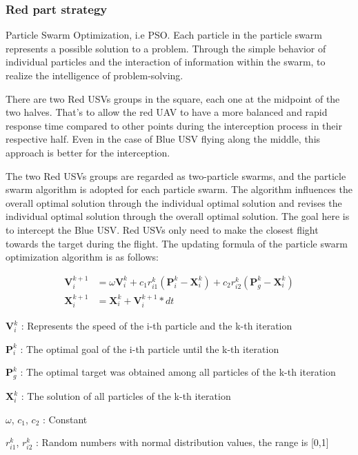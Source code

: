 \documentclass{mcmthesis}
\begin{document}
\subsubsection{Red part strategy}
	Particle Swarm Optimization, i.e PSO. Each particle in the particle swarm represents a possible solution to a problem. Through the simple behavior of individual particles and the interaction of information within the swarm,  to realize the intelligence of problem-solving. \par
	There are two Red USVs groups in the square, each one at the midpoint of the two halves. That's to allow the red UAV to have a more balanced and rapid response time compared to other points during the interception process in their respective half. Even in the case of Blue USV flying along the middle, this approach is better for the interception.\par
	The two Red USVs groups are regarded as two-particle swarms, and the particle swarm algorithm is adopted for each particle swarm. The algorithm influences the overall optimal solution through the individual optimal solution and revises the individual optimal solution through the overall optimal solution. The goal here is to intercept the Blue USV. Red USVs only need to make the closest flight towards the target during the flight. The updating formula of the particle swarm optimization algorithm is as follows:

\begin{align}
\mathbf{V}_i^{k+1} & =\omega \mathbf{V}_i^k + c_1 r_{i1}^k (\mathbf{P}_i^k - \mathbf{X}_i^k) + c_2 r_{i2}^k (\mathbf{P}_g^k - \mathbf{X}_i^k) \\
\mathbf{X}_i^{k+1} & = \mathbf{X}_i^k + \mathbf{V}_i^{k+1} * dt
\end{align}

	$\mathbf{V}_i^k$ : Represents the speed of the i-th particle and the k-th iteration \par
    $\mathbf{P}_i^k$ : The optimal goal of the i-th particle until the k-th iteration \par
	$\mathbf{P}_g^k$ : The optimal target was obtained among all particles of the k-th iteration \par
	$\mathbf{X}_i^k$ : The solution of all particles of the k-th iteration \par
	$\omega$, $c_1$, $c_2$ : Constant \par
	$r_{i1}^k$, $r_{i2}^k$ : Random numbers with normal distribution values, the range is [0,1] \par
	
\end{document}
